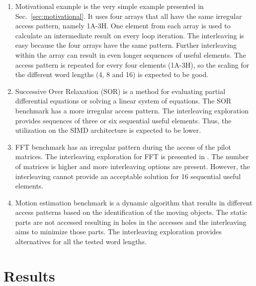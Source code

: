 \documentclass[prodmode,acmtecs]{acmsmall}
\begin{document}
\begin{enumerate}
\item Motivational example is the very simple example presented in Sec.~\ref{sec:motivational}. 
It uses four arrays that all have the same irregular access pattern, namely 1A-3H.
One element from each array is used to calculate an intermediate result on every loop iteration.
The interleaving is easy because the four arrays have the same pattern.
Further interleaving within the array can result in even longer sequences of useful elements.
The access pattern is repeated for every four elements (1A-3H), so the scaling for the different word lengths (4, 8 and 16) is expected to be good. 
\item Successive Over Relaxation (SOR) is a method for evaluating partial differential equations or solving a linear system of equations.
The SOR benchmark has a more irregular access pattern.
The interleaving exploration provides sequences of three or six sequential useful elements.
Thus, the utilization on the SIMD architecture is expected to be lower.
\item FFT benchmark has an irregular pattern during the access of the pilot matrices. 
The interleaving exploration for FFT is presented in \cite{sharma2013data}.
The number of matrices is higher and more interleaving options are present.
However, the interleaving cannot provide an acceptable solution for 16 sequential useful elements.
\item Motion estimation benchmark is a dynamic algorithm that results in different access patterns based on the identification of the moving objects. 
The static parts are not accessed resulting in holes in the accesses and the interleaving aims to minimize those parts.
The interleaving exploration provides alternatives for all the  tested word lengths. 
\end{enumerate}

\section{Results}
\label{sec:results}

\end{document}
